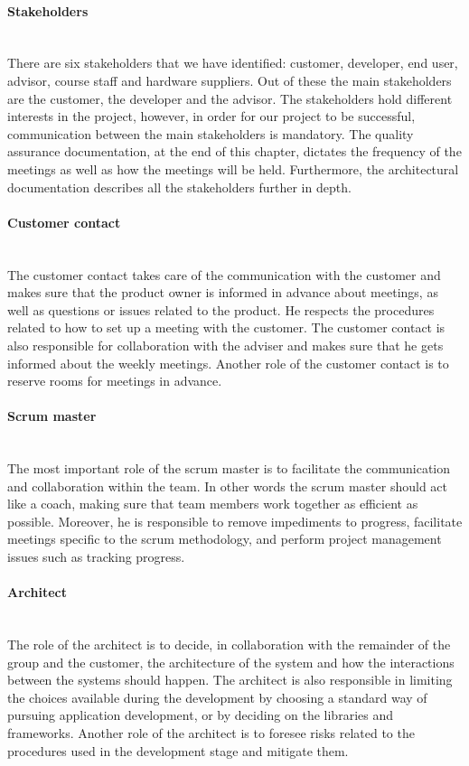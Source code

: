 \documentclass[../document.tex]{subfiles}
\begin{document}
\paragraph{Stakeholders} \ \\
There are six stakeholders that we have identified: customer, developer, end user, advisor, course staff and hardware suppliers. Out of these the main stakeholders are the customer, the developer and the advisor. The stakeholders hold different interests in the project, however, in order for our project to be successful, communication between the main stakeholders is mandatory. The quality assurance documentation, at the end of this chapter, dictates the frequency of the meetings as well as how the meetings will be held. Furthermore, the architectural documentation describes all the stakeholders further in depth.

\paragraph{Customer contact} \ \\
The customer contact takes care of the communication with the customer and makes sure that the product owner is informed in advance about meetings, as well as questions or issues related to the product. He respects the procedures related to how to set up a meeting with the customer. The customer contact is also responsible for collaboration with the adviser and makes sure that he gets informed about the weekly meetings. Another role of the customer contact is to reserve rooms for meetings in advance.

\paragraph{Scrum master} \ \\
The most important role of the scrum master is to facilitate the communication and collaboration within the team. In other words the scrum master should act like a coach, making sure that team members work together as efficient as possible. Moreover, he is responsible to remove impediments to progress, facilitate meetings specific to the scrum methodology, and perform project management issues such as tracking progress. 

\paragraph{Architect} \ \\
The role of the architect is to decide, in collaboration with the remainder of the group and the customer, the architecture of the system and how the interactions between the systems should happen. The architect is also responsible in limiting the choices available during the development by choosing a standard way of pursuing application development, or by deciding on the libraries and frameworks. Another role of the architect is to foresee risks related to the procedures used in the development stage and mitigate them. 
\end{document}
